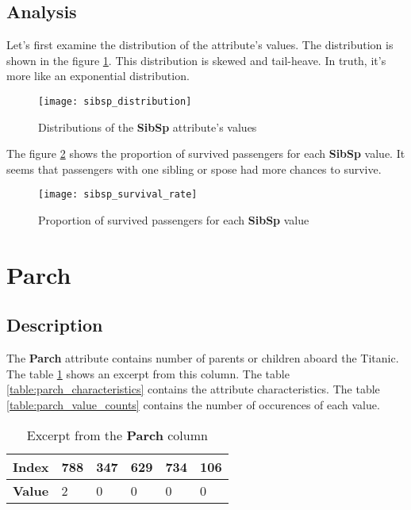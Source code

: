 \subsection{Analysis}
Let's first examine the distribution of the attribute's values. The
distribution is shown in the figure \ref{pic:sibsp_distribution}. This
distribution is skewed and tail-heave. In truth, it's more like an 
exponential distribution.

\begin{figure}[!hp]
    \centering
    \texttt{[image: sibsp\_distribution]}
    \caption{Distributions of the \textbf{SibSp} attribute's values}
    \label{pic:sibsp_distribution}
\end{figure}

The figure \ref{pic:sibsp_survival_rate} shows the proportion of survived
passengers for each \textbf{SibSp} value. It seems that passengers with
one sibling or spose had more chances to survive.

\begin{figure}[!hp]
    \centering
    \texttt{[image: sibsp\_survival\_rate]}
    \caption{Proportion of survived passengers for each \textbf{SibSp}
             value}
    \label{pic:sibsp_survival_rate}
\end{figure}


\section{Parch} \label{section:Parch}
\subsection{Description}
The \textbf{Parch} attribute contains number of parents or children 
aboard the Titanic. The table \ref{table:parch_head} shows an excerpt from
this column. The table \ref{table:parch_characteristics} contains the
attribute characteristics. The table \ref{table:parch_value_counts} contains
the number of occurences of each value.

\begin{table}[!hp]
    \centering
    \caption{Excerpt from the \textbf{Parch} column}
    \begin{tabular}{|l|l|l|l|l|l|}
        \hline
        \textbf{Index} & 788 & 347 & 629 & 734 & 106 \\ \hline
        \textbf{Value} & 2   & 0   & 0   & 0   & 0   \\ \hline
    \end{tabular}
    \label{table:parch_head}
\end{table}

